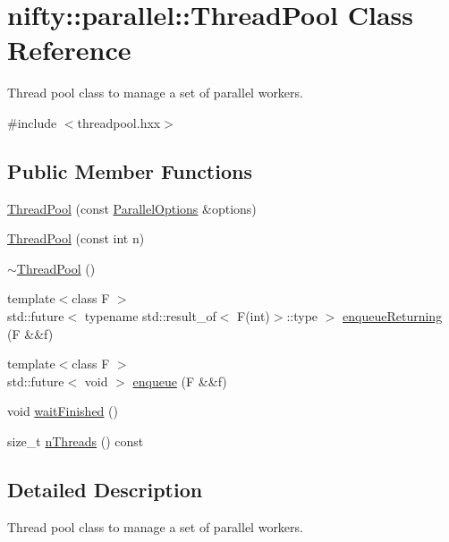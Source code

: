 \hypertarget{classnifty_1_1parallel_1_1ThreadPool}{}\section{nifty\+:\+:parallel\+:\+:Thread\+Pool Class Reference}
\label{classnifty_1_1parallel_1_1ThreadPool}


Thread pool class to manage a set of parallel workers.  




{\ttfamily \#include $<$threadpool.\+hxx$>$}

\subsection*{Public Member Functions}
\begin{DoxyCompactItemize}
\item 
\hyperlink{classnifty_1_1parallel_1_1ThreadPool_a43dcc819b5ac947b6f68a774d6fc40e7}{Thread\+Pool} (const \hyperlink{classnifty_1_1parallel_1_1ParallelOptions}{Parallel\+Options} \&options)
\item 
\hyperlink{classnifty_1_1parallel_1_1ThreadPool_ac6ddbc44375bf1ae46b73707c7eabf85}{Thread\+Pool} (const int n)
\item 
\hyperlink{group__ParallelProcessing_ga77c519ec32559623c64d61f532c570b8}{$\sim$\+Thread\+Pool} ()
\item 
{\footnotesize template$<$class F $>$ }\\std\+::future$<$ typename std\+::result\+\_\+of$<$ F(int)$>$\+::type $>$ \hyperlink{group__ParallelProcessing_ga5ffeb64ca8f60c37ad2db97bf80b05af}{enqueue\+Returning} (F \&\&f)
\item 
{\footnotesize template$<$class F $>$ }\\std\+::future$<$ void $>$ \hyperlink{group__ParallelProcessing_ga030f79847ecd6a609877dd5f997ac875}{enqueue} (F \&\&f)
\item 
void \hyperlink{classnifty_1_1parallel_1_1ThreadPool_a72bcedd7dfdb99fe347ee9da0a80cabd}{wait\+Finished} ()
\item 
size\+\_\+t \hyperlink{classnifty_1_1parallel_1_1ThreadPool_abebd5767549c0d0e07d0a8379df8dac0}{n\+Threads} () const 
\end{DoxyCompactItemize}


\subsection{Detailed Description}
Thread pool class to manage a set of parallel workers. 

